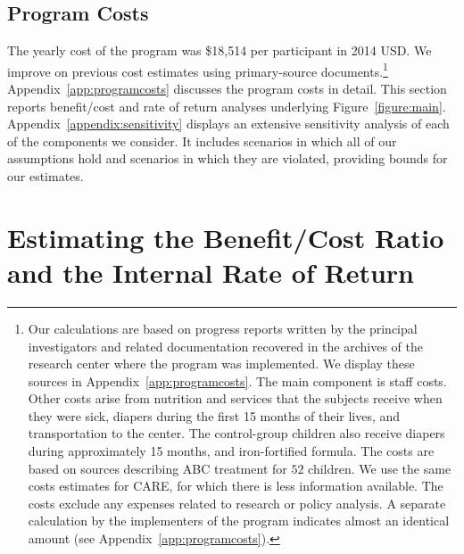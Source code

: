 \subsection{Program Costs} \label{section:programscosts}

The yearly cost of the program was \$18,514 per participant in 2014 USD. We improve on previous cost estimates using primary-source documents.\footnote{Our calculations are based on progress reports written by the principal investigators and related documentation recovered in the archives of the research center where the program was implemented. We display these sources in Appendix~\ref{app:programcosts}. The main component is staff costs. Other costs arise from nutrition and services that the subjects receive when they were sick, diapers during the first 15 months of their lives, and transportation to the center. The control-group children also receive diapers during approximately 15 months, and iron-fortified formula. The costs are based on sources describing ABC treatment for $52$ children. We use the same costs estimates for CARE, for which there is less information available. The costs exclude any expenses related to research or policy analysis. A separate calculation by the implementers of the program indicates almost an identical amount (see  Appendix~\ref{app:programcosts}).} Appendix~\ref{app:programcosts} discusses the program costs in detail. This section reports benefit/cost and rate of return analyses underlying Figure~\ref{figure:main}.  Appendix~\ref{appendix:sensitivity} displays an extensive sensitivity analysis of each of the components we consider. It includes scenarios in which all of our assumptions hold and scenarios in which they are violated, providing bounds for our estimates.

\section{Estimating the Benefit/Cost Ratio and the Internal Rate of Return} \label{section:cbaresults}

